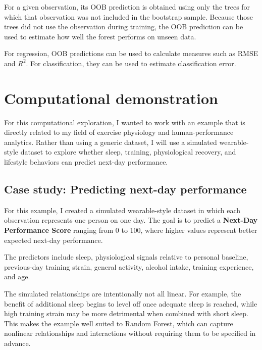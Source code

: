\documentclass[
  letterpaper,
  DIV=11,
  numbers=noendperiod]{scrreprt}
\begin{document}
For a given observation, its OOB prediction is obtained using only the
trees for which that observation was not included in the bootstrap
sample. Because those trees did not use the observation during training,
the OOB prediction can be used to estimate how well the forest performs
on unseen data.

For regression, OOB predictions can be used to calculate measures such
as RMSE and \(R^2\). For classification, they can be used to estimate
classification error.

\section{Computational demonstration}\label{computational-demonstration}

For this computational exploration, I wanted to work with an example
that is directly related to my field of exercise physiology and
human-performance analytics. Rather than using a generic dataset, I will
use a simulated wearable-style dataset to explore whether sleep,
training, physiological recovery, and lifestyle behaviors can predict
next-day performance.

\subsection{Case study: Predicting next-day
performance}\label{case-study-predicting-next-day-performance}

For this example, I created a simulated wearable-style dataset in which
each observation represents one person on one day. The goal is to
predict a \textbf{Next-Day Performance Score} ranging from 0 to 100,
where higher values represent better expected next-day performance.

The predictors include sleep, physiological signals relative to personal
baseline, previous-day training strain, general activity, alcohol
intake, training experience, and age.

The simulated relationships are intentionally not all linear. For
example, the benefit of additional sleep begins to level off once
adequate sleep is reached, while high training strain may be more
detrimental when combined with short sleep. This makes the example well
suited to Random Forest, which can capture nonlinear relationships and
interactions without requiring them to be specified in advance.
\end{document}
